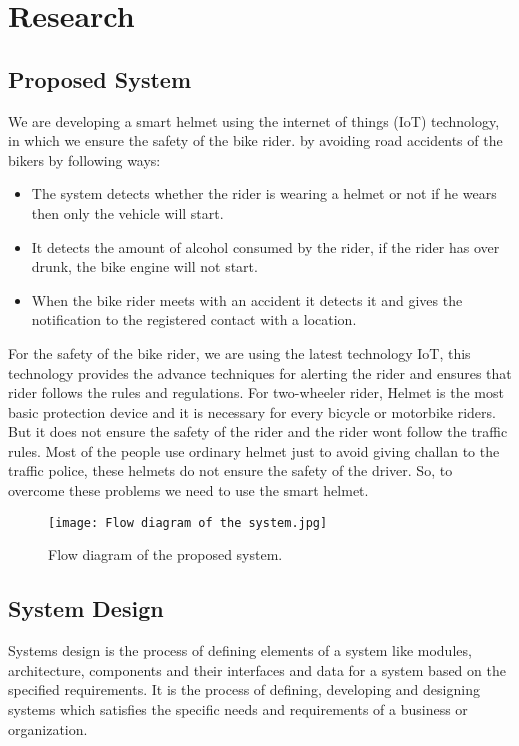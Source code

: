 \chapter{Research}
\section{Proposed System}
We are developing a smart helmet using the internet of things (IoT) technology, in which we ensure the safety of the bike rider. by avoiding road accidents of the bikers by following ways:
\begin{itemize}
	\item The system detects whether the rider is wearing a helmet or not if he wears then only the vehicle will start.
	
	\item It detects the amount of alcohol consumed by the rider, if the rider has over drunk, the bike engine will not start.
	
	\item When the bike rider meets with an accident it detects it and gives the notification to the registered contact with a location.
	
\end{itemize}
For the safety of the bike rider, we are using the latest technology IoT, this technology provides the advance techniques for alerting the rider and ensures that rider follows the rules and regulations. For two-wheeler rider, Helmet is the most basic protection device and it is necessary for every bicycle or motorbike riders. But it does not ensure the safety of the rider and the rider wont follow the traffic rules. Most of the people use ordinary helmet just to avoid giving challan to the traffic police, these helmets do not ensure the safety of the driver. So, to overcome these problems we need to use the smart helmet.

\begin{figure}[h]
	\centering
	\texttt{[image: Flow diagram of the system.jpg]}
	\caption{Flow diagram of the proposed system.}
\end{figure}
\pagebreak
\section{System Design}
Systems design is the process of defining elements of a system like modules, architecture, components and their interfaces and data for a system based on the specified requirements. It is the process of defining, developing and designing systems which satisfies the specific needs and requirements of a business or organization.
\vspace{.5cm}

